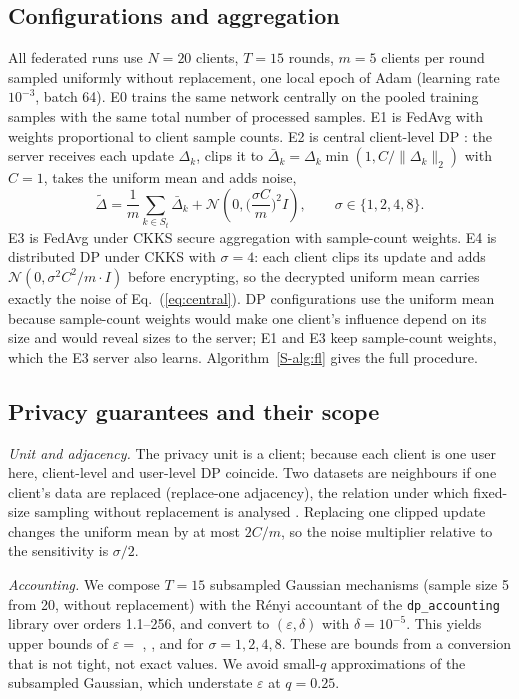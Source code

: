 \documentclass[11pt,a4paper]{article}
\begin{document}
\subsection{Configurations and aggregation}

All federated runs use $N=20$ clients, $T=15$ rounds, $m=5$ clients per round sampled uniformly without replacement, one local epoch of Adam (learning rate $10^{-3}$, batch 64). E0 trains the same network centrally on the pooled training samples with the same total number of processed samples. E1 is FedAvg with weights proportional to client sample counts. E2 is central client-level DP \cite{mcmahan2018learning}: the server receives each update $\Delta_k$, clips it to $\bar\Delta_k=\Delta_k\min(1,C/\lVert\Delta_k\rVert_2)$ with $C=1$, takes the uniform mean and adds noise,
\begin{equation}
\tilde\Delta = \frac{1}{m}\sum_{k\in S_t}\bar\Delta_k + \mathcal{N}\!\left(0,\Big(\frac{\sigma C}{m}\Big)^2 I\right),\qquad \sigma\in\{1,2,4,8\}.
\label{eq:central}
\end{equation}
E3 is FedAvg under CKKS secure aggregation with sample-count weights. E4 is distributed DP under CKKS with $\sigma=4$: each client clips its update and adds $\mathcal{N}(0,\sigma^2C^2/m\cdot I)$ before encrypting, so the decrypted uniform mean carries exactly the noise of Eq.~(\ref{eq:central}). DP configurations use the uniform mean because sample-count weights would make one client's influence depend on its size and would reveal sizes to the server; E1 and E3 keep sample-count weights, which the E3 server also learns. Algorithm~\ref{S-alg:fl} gives the full procedure.

\subsection{Privacy guarantees and their scope}
\label{sec:guarantees}

\textit{Unit and adjacency.} The privacy unit is a client; because each client is one user here, client-level and user-level DP coincide. Two datasets are neighbours if one client's data are replaced (replace-one adjacency), the relation under which fixed-size sampling without replacement is analysed \cite{wang2019subsampled}. Replacing one clipped update changes the uniform mean by at most $2C/m$, so the noise multiplier relative to the sensitivity is $\sigma/2$.

\textit{Accounting.} We compose $T=15$ subsampled Gaussian mechanisms (sample size 5 from 20, without replacement) with the R\'enyi accountant of the \texttt{dp\_accounting} library over orders 1.1--256, and convert to $(\varepsilon,\delta)$ with $\delta=10^{-5}$. This yields upper bounds of $\varepsilon=$ , ,  and  for $\sigma=1,2,4,8$. These are bounds from a conversion that is not tight, not exact values. We avoid small-$q$ approximations of the subsampled Gaussian, which understate $\varepsilon$ at $q=0.25$.
\end{document}
